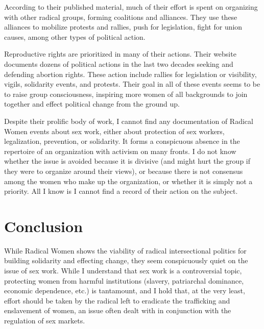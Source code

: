 \documentclass[man,12pt,natbib]{apa6}
\begin{document}
According to their published material, much of their effort is spent on
organizing with other radical groups, forming coalitions and alliances. They
use these alliances to mobilize protests and rallies, push for legislation,
fight for union causes, among other types of political action.

Reproductive rights are prioritized in many of their actions. Their website
documents dozens of political actions in the last two decades seeking and
defending abortion rights. These action include rallies for legislation or
visibility, vigils, solidarity events, and protests. Their goal in all of these
events seems to be to raise group consciousness, inspiring more women of all
backgrounds to join together and effect political change from the ground up.

Despite their prolific body of work, I cannot find any documentation of Radical
Women events about sex work, either about protection of sex workers,
legalization, prevention, or solidarity. It forms a conspicuous absence in the
repertoire of an organization with activism on many fronts. I do not know
whether the issue is avoided because it is divisive (and might hurt the group
if they were to organize around their views), or because there is not consensus
among the women who make up the organization, or whether it is simply not a
priority. All I know is I cannot find a record of their action on the subject.

\section{Conclusion}

While Radical Women shows the viability of radical intersectional politics for
building solidarity and effecting change, they seem conspicuously quiet on the
issue of sex work. While I understand that sex work is a controversial topic,
protecting women from harmful institutions (slavery, patriarchal dominance,
economic dependence, etc.) is tantamount, and I hold that, at the very least,
effort should be taken by the radical left to eradicate the trafficking and
enslavement of women, an issue often dealt with in conjunction with the
regulation of sex markets.

\clearpage

\end{document}
